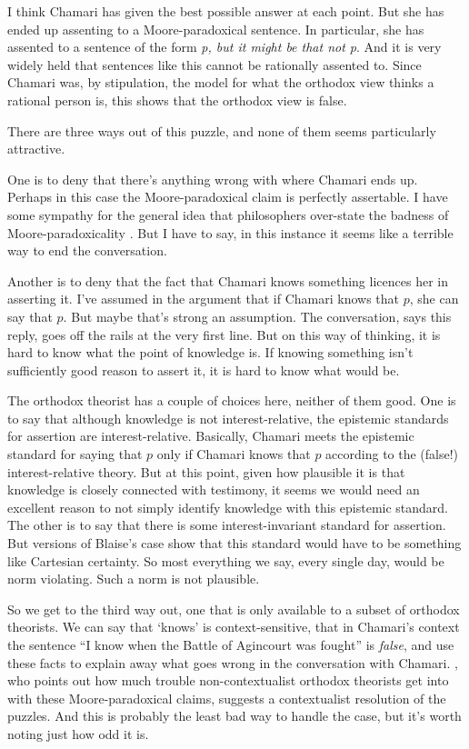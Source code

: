 \documentclass[11pt,]{book}
\begin{document}
I think Chamari has given the best possible answer at each point. But she has ended up assenting to a Moore-paradoxical sentence. In particular, she has assented to a sentence of the form \emph{p, but it might be that not p}. And it is very widely held that sentences like this cannot be rationally assented to. Since Chamari was, by stipulation, the model for what the orthodox view thinks a rational person is, this shows that the orthodox view is false.

There are three ways out of this puzzle, and none of them seems particularly attractive.

One is to deny that there's anything wrong with where Chamari ends up. Perhaps in this case the Moore-paradoxical claim is perfectly assertable. I have some sympathy for the general idea that philosophers over-state the badness of Moore-paradoxicality \citep{MaitraWeatherson2010}. But I have to say, in this instance it seems like a terrible way to end the conversation.

Another is to deny that the fact that Chamari knows something licences her in asserting it. I've assumed in the argument that if Chamari knows that \(p\), she can say that \(p\). But maybe that's strong an assumption. The conversation, says this reply, goes off the rails at the very first line. But on this way of thinking, it is hard to know what the point of knowledge is. If knowing something isn't sufficiently good reason to assert it, it is hard to know what would be.

The orthodox theorist has a couple of choices here, neither of them good. One is to say that although knowledge is not interest-relative, the epistemic standards for assertion are interest-relative. Basically, Chamari meets the epistemic standard for saying that \(p\) only if Chamari knows that \(p\) according to the (false!) interest-relative theory. But at this point, given how plausible it is that knowledge is closely connected with testimony, it seems we would need an excellent reason to not simply identify knowledge with this epistemic standard. The other is to say that there is some interest-invariant standard for assertion. But versions of Blaise's case show that this standard would have to be something like Cartesian certainty. So most everything we say, every single day, would be norm violating. Such a norm is not plausible.

So we get to the third way out, one that is only available to a subset of orthodox theorists. We can say that `knows' is context-sensitive, that in Chamari's context the sentence ``I know when the Battle of Agincourt was fought'' is \emph{false}, and use these facts to explain away what goes wrong in the conversation with Chamari. \citet{ArmourGarb2011}, who points out how much trouble non-contextualist orthodox theorists get into with these Moore-paradoxical claims, suggests a contextualist resolution of the puzzles. And this is probably the least bad way to handle the case, but it's worth noting just how odd it is.
\end{document}
